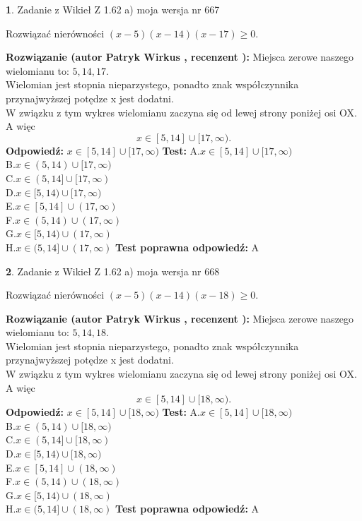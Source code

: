 \documentclass[12pt, a4paper]{article}
\theoremstyle{definition} %
\newtheorem{zad}{}
\newcommand{\zadStart}[1]{\begin{zad}#1\newline}
\newcommand{\zadStop}{\end{zad}}
\newcommand{\rozwStart}[2]{\noindent \textbf{Rozwiązanie (autor #1 , recenzent #2): }\newline}
\newcommand{\rozwStop}{\newline}
\newcommand{\odpStart}{\noindent \textbf{Odpowiedź:}\newline}
\newcommand{\odpStop}{\newline}
\newcommand{\testStart}{\noindent \textbf{Test:}\newline}
\newcommand{\testStop}{\newline}
\newcommand{\kluczStart}{\noindent \textbf{Test poprawna odpowiedź:}\newline}
\newcommand{\kluczStop}{\newline}
\begin{document}
\zadStart{Zadanie z Wikieł Z 1.62 a) moja wersja nr 667}

Rozwiązać nierówności $(x-5)(x-14)(x-17)\ge0$.
\zadStop
\rozwStart{Patryk Wirkus}{}
Miejsca zerowe naszego wielomianu to: $5, 14, 17$.\\
Wielomian jest stopnia nieparzystego, ponadto znak współczynnika przy\linebreak najwyższej potędze x jest dodatni.\\ W związku z tym wykres wielomianu zaczyna się od lewej strony poniżej osi OX. A więc $$x \in [5,14] \cup [17,\infty).$$
\rozwStop
\odpStart
$x \in [5,14] \cup [17,\infty)$
\odpStop
\testStart
A.$x \in [5,14] \cup [17,\infty)$\\
B.$x \in (5,14) \cup [17,\infty)$\\
C.$x \in (5,14] \cup [17,\infty)$\\
D.$x \in [5,14) \cup [17,\infty)$\\
E.$x \in [5,14] \cup (17,\infty)$\\
F.$x \in (5,14) \cup (17,\infty)$\\
G.$x \in [5,14) \cup (17,\infty)$\\
H.$x \in (5,14] \cup (17,\infty)$
\testStop
\kluczStart
A
\kluczStop



\zadStart{Zadanie z Wikieł Z 1.62 a) moja wersja nr 668}

Rozwiązać nierówności $(x-5)(x-14)(x-18)\ge0$.
\zadStop
\rozwStart{Patryk Wirkus}{}
Miejsca zerowe naszego wielomianu to: $5, 14, 18$.\\
Wielomian jest stopnia nieparzystego, ponadto znak współczynnika przy\linebreak najwyższej potędze x jest dodatni.\\ W związku z tym wykres wielomianu zaczyna się od lewej strony poniżej osi OX. A więc $$x \in [5,14] \cup [18,\infty).$$
\rozwStop
\odpStart
$x \in [5,14] \cup [18,\infty)$
\odpStop
\testStart
A.$x \in [5,14] \cup [18,\infty)$\\
B.$x \in (5,14) \cup [18,\infty)$\\
C.$x \in (5,14] \cup [18,\infty)$\\
D.$x \in [5,14) \cup [18,\infty)$\\
E.$x \in [5,14] \cup (18,\infty)$\\
F.$x \in (5,14) \cup (18,\infty)$\\
G.$x \in [5,14) \cup (18,\infty)$\\
H.$x \in (5,14] \cup (18,\infty)$
\testStop
\kluczStart
A
\kluczStop
\end{document}
